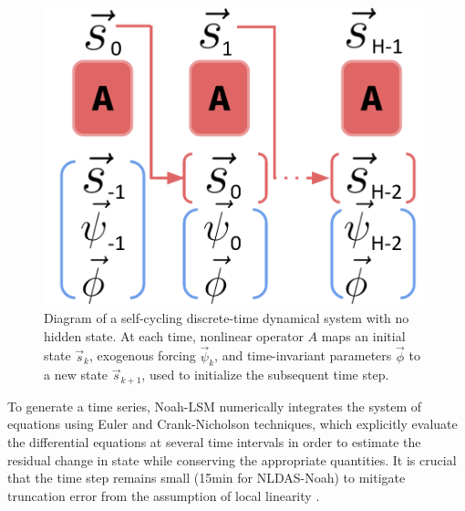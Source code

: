\documentclass[11pt]{article}
\begin{document}
\begin{multicols}{2}
    \begin{figure}[H]
        \centering

        \includegraphics[width=.66\linewidth]{figs/abstract_scann.png}

        \caption{Diagram of a self-cycling discrete-time dynamical system with no hidden state. At each time, nonlinear operator $A$ maps an initial state $\vec{s}_k$, exogenous forcing $\vec{\psi}_k$, and time-invariant parameters $\vec{\phi}$ to a new state $\vec{s}_{k+1}$, used to initialize the subsequent time step.}
        \label{scann}
    \end{figure}

    \vspace{-1.2em}

    To generate a time series, Noah-LSM numerically integrates the system of equations using Euler and Crank-Nicholson techniques, which explicitly evaluate the differential equations at several time intervals in order to estimate the residual change in state while conserving the appropriate quantities. It is crucial that the time step remains small (15min for NLDAS-Noah) to mitigate truncation error from the assumption of local linearity \cite{mitchell_multi-institution_2004}\cite{cartwright_dynamics_1992}.

\end{multicols}
\end{document}
